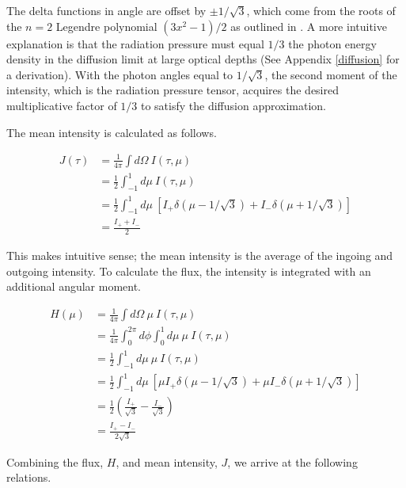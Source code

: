 \documentclass[onecolumn]{aastex63}
\begin{document}
\noindent The delta functions in angle are offset by $\pm 1/\sqrt{3}$, which come from the roots of the $n=2$ Legendre polynomial $(3x^2 - 1)/2$ as outlined in \cite{1950ratr.book.....C}. A more intuitive explanation is that the radiation pressure must equal $1/3$ the photon energy density in the diffusion limit at large optical depths (See Appendix \ref{diffusion} for a derivation). With the photon angles equal to $1/\sqrt{3}$, the second moment of the intensity, which is the radiation pressure tensor, acquires the desired multiplicative factor of $1/3$ to satisfy the diffusion approximation.

The mean intensity is calculated as follows.

\begin{equation}
    \begin{split}
    J(\tau) &= \frac{1}{4\pi}\int d\Omega\ I(\tau, \mu)\\ 
    &= \frac{1}{2}\int_{-1}^1 d\mu\ I(\tau, \mu)\\
    &= \frac{1}{2}\int_{-1}^1 d\mu\ \left[I_+ \delta(\mu - 1/\sqrt{3}) + I_- \delta(\mu + 1/\sqrt{3})\right]\\
    &= \frac{I_+ + I_-}{2}
    \end{split}
\end{equation}

\noindent This makes intuitive sense; the mean intensity is the average of the ingoing and outgoing intensity. To calculate the flux, the intensity is integrated with an additional angular moment.


\begin{equation}
    \begin{split}
        H(\mu) &= \frac{1}{4\pi}\int d\Omega\ \mu\ I(\tau, \mu)\\
        &= \frac{1}{4\pi}\int_0^{2\pi} d\phi \int_0^1 d\mu\ \mu\ I(\tau, \mu)\\
        &= \frac{1}{2} \int_{-1}^1 d\mu\ \mu\ I(\tau, \mu)\\
        &= \frac{1}{2} \int_{-1}^1 d\mu\ \left[\mu I_+ \delta(\mu - 1/\sqrt{3}) + \mu I_- \delta(\mu + 1/\sqrt{3})\right]\\
        &= \frac{1}{2} \left( \frac{I_+}{\sqrt{3}} - \frac{I_-}{\sqrt{3}}\right) \\
        &= \frac{I_+ - I_-}{2\sqrt{3}}
    \end{split}
\end{equation}

\noindent Combining the flux, $H$, and mean intensity, $J$, we arrive at the following relations.
\end{document}
